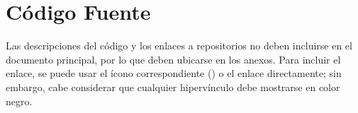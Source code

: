 \chapter{Código Fuente} \label{chap:AnexoB}

Las descripciones del código y los enlaces a repositorios no deben incluirse en el documento principal, por lo que deben ubicarse en los anexos. Para incluir el enlace, se puede usar el ícono correspondiente (\href{https://github.com}{\faGithub}) o el enlace directamente; sin embargo, cabe considerar que cualquier hipervínculo debe mostrarse en color negro.